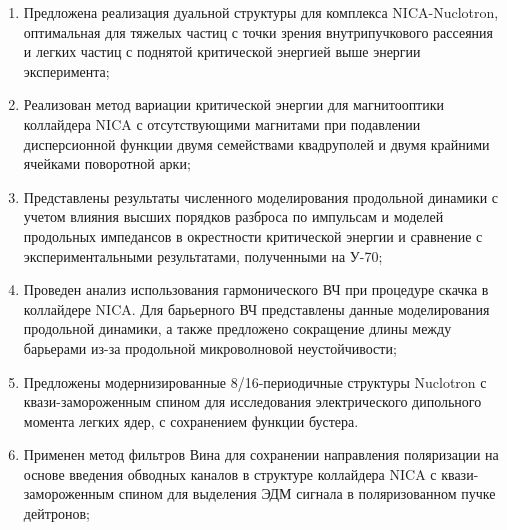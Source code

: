 \par {}
\begin{enumerate}[beginpenalty=10000] %
	\item 	Предложена реализация дуальной структуры для комплекса NICA-Nuclotron, оптимальная для тяжелых частиц с точки зрения внутрипучкового рассеяния и легких частиц с поднятой критической энергией выше энергии эксперимента; \cite{Kolokolchikov:2025_dual, Syresin:2021_polar}
	\item	Реализован метод вариации критической энергии для магнитооптики коллайдера NICA с отсутствующими магнитами при подавлении дисперсионной функции двумя семействами квадруполей и двумя крайними ячейками поворотной арки; \cite{Kolokolchikov:2021trans, Kolokolchikov:2023_pecular}
	\item	Представлены результаты численного моделирования продольной динамики с учетом влияния высших порядков разброса по импульсам и моделей продольных импедансов в окрестности критической энергии и сравнение с экспериментальными результатами, полученными на У-70; \cite{Kolokolchikov:2025_U70, Kolokolchikov:2025_jump}
	\item 	Проведен анализ использования гармонического ВЧ при процедуре скачка в коллайдере NICA. Для барьерного ВЧ представлены данные моделирования продольной динамики, а также предложено сокращение длины между барьерами из-за продольной микроволновой неустойчивости; \cite{Kolokolchikov:2024_bb_rupac, Kolokolchikov:2023_bb_IPAC, Kolokolchikov:2024_bb_dspin}
	\item	Предложены модернизированные 8/16-периодичные структуры Nuclotron с квази-замороженным спином для исследования электрического дипольного момента легких ядер, с сохранением функции бустера. \cite{Senichev:2023_QFS, Senichev:2023_nuclotron, Kolokolchikov:2025_nuclotron}
	\item	Применен метод фильтров Вина для сохранении направления поляризации на основе введения обводных каналов в структуре коллайдера NICA с квази-замороженным спином для выделения ЭДМ сигнала в поляризованном пучке дейтронов;\cite{Kolokolchikov:2023_bypass, Kolokolchikov:2023_bypass_IPAC, Senichev:2024_nica_edm, Kolokolchikov:2023_sc, Kolokolchikov:2023_sc_IPAC}
\end{enumerate}

